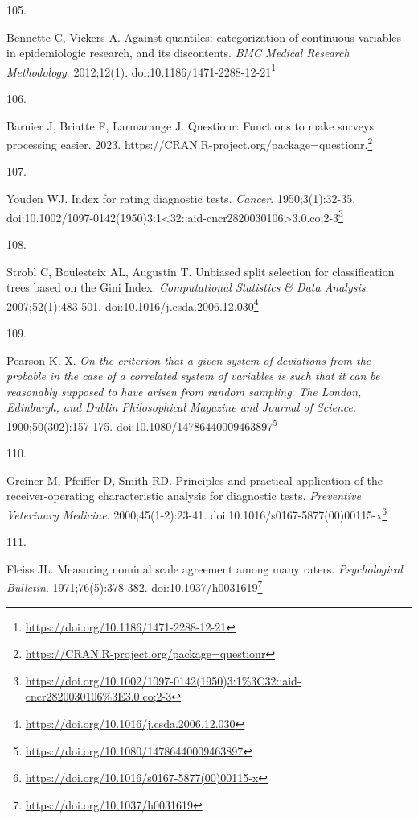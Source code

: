 \documentclass[
  a4paper,
]{book}
\newlength{\cslhangindent}
\newlength{\csllabelwidth}
\newlength{\cslentryspacingunit} %
\newenvironment{CSLReferences}[2] %
 {%
  \setlength{\parindent}{0pt}
  \ifodd #1
  \let\oldpar\par
  \def\par{\hangindent=\cslhangindent\oldpar}
  \fi
  \setlength{\parskip}{#2\cslentryspacingunit}
 }%
 {}
\newcommand{\CSLLeftMargin}[1]{\parbox[t]{\csllabelwidth}{#1}}
\newcommand{\CSLRightInline}[1]{\parbox[t]{\linewidth - \csllabelwidth}{#1}\break}
\renewcommand{\href}[2]{#2\footnote{\url{#1}}}
\begin{document}
\begin{CSLReferences}{0}{0}
\leavevmode{}%
\CSLLeftMargin{105. }%
\CSLRightInline{Bennette C, Vickers A. Against quantiles: categorization of continuous variables in epidemiologic research, and its discontents. \emph{BMC Medical Research Methodology}. 2012;12(1). doi:\href{https://doi.org/10.1186/1471-2288-12-21}{10.1186/1471-2288-12-21}}

\leavevmode{}%
\CSLLeftMargin{106. }%
\CSLRightInline{Barnier J, Briatte F, Larmarange J. Questionr: Functions to make surveys processing easier. 2023. \href{https://CRAN.R-project.org/package=questionr}{https://CRAN.R-project.org/package=questionr.}}

\leavevmode{}%
\CSLLeftMargin{107. }%
\CSLRightInline{Youden WJ. Index for rating diagnostic tests. \emph{Cancer}. 1950;3(1):32-35. doi:\href{https://doi.org/10.1002/1097-0142(1950)3:1\%3C32::aid-cncr2820030106\%3E3.0.co;2-3}{10.1002/1097-0142(1950)3:1\textless32::aid-cncr2820030106\textgreater3.0.co;2-3}}

\leavevmode{}%
\CSLLeftMargin{108. }%
\CSLRightInline{Strobl C, Boulesteix AL, Augustin T. Unbiased split selection for classification trees based on the Gini Index. \emph{Computational Statistics \& Data Analysis}. 2007;52(1):483-501. doi:\href{https://doi.org/10.1016/j.csda.2006.12.030}{10.1016/j.csda.2006.12.030}}

\leavevmode{}%
\CSLLeftMargin{109. }%
\CSLRightInline{Pearson K. X. {\emph{On the criterion that a given system of deviations from the probable in the case of a correlated system of variables is such that it can be reasonably supposed to have arisen from random sampling}}. \emph{The London, Edinburgh, and Dublin Philosophical Magazine and Journal of Science}. 1900;50(302):157-175. doi:\href{https://doi.org/10.1080/14786440009463897}{10.1080/14786440009463897}}

\leavevmode{}%
\CSLLeftMargin{110. }%
\CSLRightInline{Greiner M, Pfeiffer D, Smith RD. Principles and practical application of the receiver-operating characteristic analysis for diagnostic tests. \emph{Preventive Veterinary Medicine}. 2000;45(1-2):23-41. doi:\href{https://doi.org/10.1016/s0167-5877(00)00115-x}{10.1016/s0167-5877(00)00115-x}}

\leavevmode{}%
\CSLLeftMargin{111. }%
\CSLRightInline{Fleiss JL. Measuring nominal scale agreement among many raters. \emph{Psychological Bulletin}. 1971;76(5):378-382. doi:\href{https://doi.org/10.1037/h0031619}{10.1037/h0031619}}


\end{CSLReferences}
\end{document}
